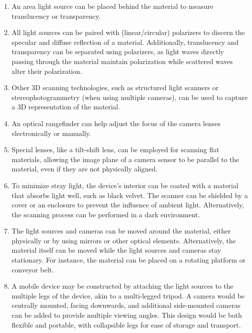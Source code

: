 \documentclass[11pt, twoside, listof=totocnumbered, bibliography=totocnumbered]{scrartcl}
\begin{document}
\begin{enumerate}
	\item An area light source can be placed behind the material to measure translucency or transparency.
	
	\item All light sources can be paired with (linear/circular) polarizers to discern the specular and diffuse reflection of a material. Additionally, translucency and transparency can be separated using polarizers, as light waves directly passing through the material maintain polarization while scattered waves alter their polarization.
	
	\item Other 3D scanning technologies, such as structured light scanners or stereophotogrammetry (when using multiple cameras), can be used to capture a 3D representation of the material.
	
	\item An optical rangefinder can help adjust the focus of the camera lenses electronically or manually.
	
	\item Special lenses, like a tilt-shift lens, can be employed for scanning flat materials, allowing the image plane of a camera sensor to be parallel to the material, even if they are not physically aligned.
	
	\item To minimize stray light, the device's interior can be coated with a material that absorbs light well, such as black velvet. The scanner can be shielded by a cover or an enclosure to prevent the influence of ambient light. Alternatively, the scanning process can be performed in a dark environment.
	
	\item The light sources and cameras can be moved around the material, either physically or by using mirrors or other optical elements. Alternatively, the material itself can be moved while the light sources and cameras stay stationary. For instance, the material can be placed on a rotating platform or conveyor belt.
	
	\item A mobile device may be constructed by attaching the light sources to the multiple legs of the device, akin to a multi-legged tripod. A camera would be centrally mounted, facing downwards, and additional side-mounted cameras can be added to provide multiple viewing angles. This design would be both flexible and portable, with collapsible legs for ease of storage and transport.
	

\end{enumerate}
\end{document}

